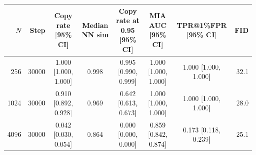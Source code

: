 \begin{tabular}{rrcccccr}
\toprule
$N$ & Step & Copy rate [95\% CI] & Median NN sim & Copy rate at 0.95 [95\% CI] & MIA AUC [95\% CI] & TPR@1\%FPR [95\% CI] & FID \\
\midrule
256 & 30000 & 1.000 [1.000, 1.000] & 0.998 & 0.995 [0.990, 0.999] & 1.000 [1.000, 1.000] & 1.000 [1.000, 1.000] & 32.1 \\
1024 & 30000 & 0.910 [0.892, 0.928] & 0.969 & 0.642 [0.613, 0.673] & 1.000 [1.000, 1.000] & 1.000 [1.000, 1.000] & 28.0 \\
4096 & 30000 & 0.042 [0.030, 0.054] & 0.864 & 0.000 [0.000, 0.000] & 0.859 [0.842, 0.874] & 0.173 [0.118, 0.239] & 25.1 \\
\bottomrule
\end{tabular}
